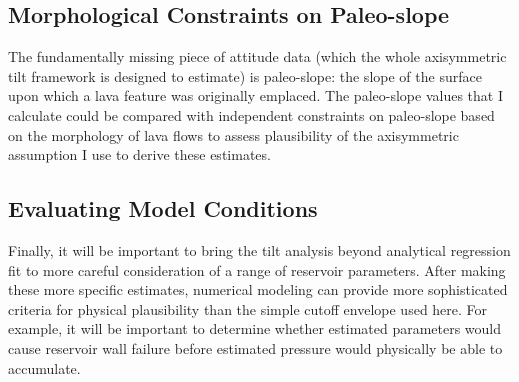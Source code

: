 \subsection{Morphological Constraints on Paleo-slope}

The fundamentally missing piece of attitude data (which the whole axisymmetric tilt framework is designed to estimate) is paleo-slope: the slope of the surface upon which a lava feature was originally emplaced. The paleo-slope values that I calculate could be compared with independent constraints on paleo-slope based on the morphology of lava flows \parencite{wadge_lobes_1991, peitersen_correlations_2000, peters_lava_2021} to assess plausibility of the axisymmetric assumption I use to derive these estimates.

\subsection{Evaluating Model Conditions}

Finally, it will be important to bring the tilt analysis beyond analytical regression fit to more careful consideration of a range of reservoir parameters. After making these more specific estimates, numerical modeling can provide more sophisticated criteria for physical plausibility than the simple cutoff envelope used here. For example, it will be important to determine whether estimated parameters would cause reservoir wall failure before estimated pressure would physically be able to accumulate. 